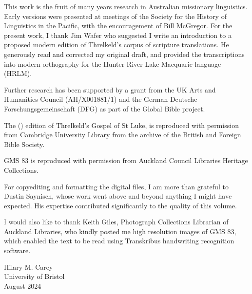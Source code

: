 \addchap{\lsAcknowledgementTitle} 

This work is the fruit of many years research in Australian missionary linguistics. Early versions were presented at meetings of the Society for the History of Linguistics in the Pacific, with the encouragement of Bill McGregor. For the present work, I thank Jim Wafer who suggested I write an introduction to a proposed modern edition of Threlkeld’s corpus of scripture translations. He generously read and corrected my original draft, and provided the transcriptions into modern orthography for the Hunter River Lake Macquarie language (HRLM).

Further research has been supported by a grant from the UK Arts and Humanities Council (AH/X001881/1) and the German Deutsche Forschungsgemeinschaft (DFG) as part of the Global Bible project.

The \citeauthor{fraser_gospel_1891} (\citeyear{fraser_gospel_1891}) edition of Threlkeld’s Gospel of St Luke, is reproduced with permission from Cambridge University Library from the archive of the British and Foreign Bible Society.

GMS 83 is reproduced with permission from Auckland Council Libraries Heritage Collections.

For copyediting and formatting the digital files, I am more than grateful to Dustin Saynisch, whose work went above and beyond anything I might have expected. His expertise contributed significantly to the quality of this volume.

I would also like to thank Keith Giles, Photograph Collections Librarian of Auckland Libraries, who kindly posted me high resolution images of GMS 83, which enabled the text to be read using Transkribus handwriting recognition software.

\bigskip

\noindent Hilary M. Carey\\
University of Bristol\\
August 2024
